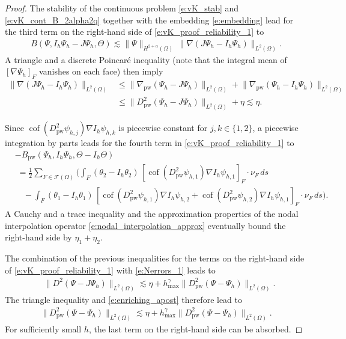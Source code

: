 \documentclass[a4paper]{amsart}
\theoremstyle{definition}
\numberwithin{equation}{section}
\numberwithin{theorem}{section}
\newcommand{\pw}{\mathrm{pw}}
\newcommand{\cof}{\operatorname{cof}}
\begin{document}
\begin{proof}
    
    The stability of the continuous problem \eqref{e:vK_stab} 
    and \eqref{e:vK_cont_B_2alpha2q} together with 
    the embedding \eqref{e:embedding}
    lead for the third term on the right-hand side 
    of \eqref{e:vK_proof_reliability_1} to 
    \begin{align*}
        B(\Psi,I_h\Psi_h-J\Psi_h,\Theta)
        \lesssim \lVert \Psi\rVert_{H^{2+\alpha}(\Omega)} 
              \,\rVert \nabla (J\Psi_h-I_h\Psi_h)\rVert_{L^2(\Omega)}.
    \end{align*}
    A triangle and a discrete Poincar\'e inequality 
    \cite{Brenner2003} (note that the integral mean of 
    $[\nabla\Psi_h]_F$ vanishes on each face) then imply 
    \begin{align*}
        \lVert \nabla (J\Psi_h-I_h\Psi_h)\rVert_{L^2(\Omega)}
        &\leq \lVert\nabla_\pw (\Psi_h-J\Psi_h)\rVert_{L^2(\Omega)}
            + \lVert\nabla_\pw (\Psi_h-I_h\Psi_h)\rVert_{L^2(\Omega)}\\
        &\leq \lVert D_\pw^2 (\Psi_h-J\Psi_h)\rVert_{L^2(\Omega)}
            + \eta
        \lesssim \eta.
    \end{align*}
    
    Since $\cof(D_\pw^2\psi_{h,j})\nabla I_h\psi_{h,k}$ is piecewise 
    constant for $j,k\in\{1,2\}$,
    a piecewise integration by parts leads for the fourth term 
    in \eqref{e:vK_proof_reliability_1}
    to 
    \begin{align*}
        &-B_\pw(\Psi_h,I_h\Psi_h,\Theta-I_h\Theta)\\
        &\;
        = \frac12 \sum_{F\in\mathcal{F}(\Omega)} 
           \bigg(
               \int_F (\theta_2-I_h\theta_2)
              \,[\cof(D_\pw^2\psi_{h,1})\nabla I_h\psi_{h,1}]_F\cdot \nu_F\,ds\\
        &\quad
              -\int_F (\theta_1-I_h\theta_1)
              \,[\cof(D_\pw^2\psi_{h,1})\nabla I_h\psi_{h,2}
                 + \cof(D_\pw^2\psi_{h,2})\nabla I_h\psi_{h,1}]_F\cdot \nu_F\,ds
              \bigg).
    \end{align*}
    A Cauchy and a trace inequality and the approximation properties 
    of the nodal interpolation operator \eqref{e:nodal_interpolation_approx}
    eventually bound the right-hand side by $\eta_1+\eta_2$.
    
    
    The combination of the previous inequalities for the terms on the 
    right-hand side of \eqref{e:vK_proof_reliability_1} with 
    \eqref{e:Nerrors_1} leads to 
    \begin{align*}
        &\lVert D^2(\Psi-J\Psi_h)\rVert_{L^2(\Omega)}
        \lesssim \eta 
            + h_{\max}^\gamma\lVert D_\pw^2(\Psi-\Psi_h)\rVert_{L^2(\Omega)}
              .
    \end{align*}
    The triangle inequality and \eqref{e:enriching_apost} 
    therefore lead to 
    \begin{align*}
        \lVert D^2_\pw(\Psi-\Psi_h)\rVert_{L^2(\Omega)}
        \lesssim \eta 
            + h_{\max}^\gamma\lVert D_\pw^2(\Psi-\Psi_h)\rVert_{L^2(\Omega)}.
    \end{align*}
    For sufficiently small $h$, the last term
    on the right-hand side can be absorbed.
\end{proof}
\end{document}
